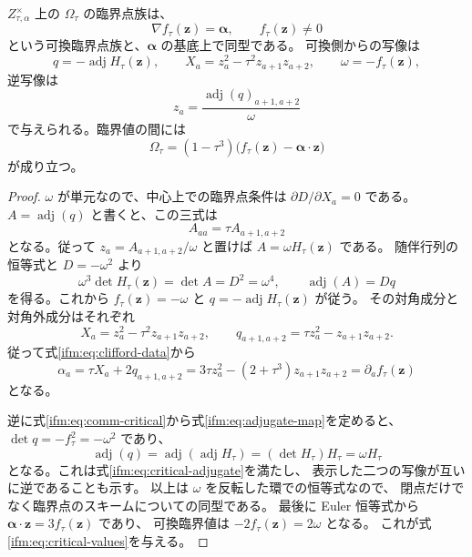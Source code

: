 \begin{lemma}[非零中心値における臨界点の明示同型]
\label{ifm:lem:adjugate-critical}
$Z_{\tau,\alpha}^{\times}$ 上の $\Omega_\tau$ の臨界点族は、
\begin{equation}\label{ifm:eq:comm-critical}
        \nabla f_\tau(\mathbf z)=\boldsymbol\alpha,
                    \qquad f_\tau(\mathbf z)\ne0
\end{equation}
という可換臨界点族と、$\boldsymbol\alpha$ の基底上で同型である。
可換側からの写像は
\begin{equation}\label{ifm:eq:adjugate-map}
 q=-\operatorname{adj}H_\tau(\mathbf z),\qquad
 X_a=z_a^2-\tau^2z_{a+1}z_{a+2},\qquad
 \omega=-f_\tau(\mathbf z),
\end{equation}
逆写像は
\begin{equation}\label{ifm:eq:adjugate-inverse}
              z_a=\frac{\operatorname{adj}(q)_{a+1,a+2}}{\omega}
\end{equation}
で与えられる。臨界値の間には
\begin{equation}\label{ifm:eq:critical-values}
   \Omega_\tau=(1-\tau^3)
           \bigl(f_\tau(\mathbf z)-\boldsymbol\alpha\cdot\mathbf z\bigr)
\end{equation}
が成り立つ。
\end{lemma}

\begin{proof}
$\omega$ が単元なので、中心上での臨界点条件は
$\partial D/\partial X_a=0$ である。
$A=\operatorname{adj}(q)$ と書くと、この三式は
\begin{equation}\label{ifm:eq:critical-adjugate}
                         A_{aa}=\tau A_{a+1,a+2}
\end{equation}
となる。従って $z_a=A_{a+1,a+2}/\omega$ と置けば
$A=\omega H_\tau(\mathbf z)$ である。
随伴行列の恒等式と $D=-\omega^2$ より
\[
 \omega^3\det H_\tau(\mathbf z)=\det A=D^2=\omega^4,
 \qquad
 \operatorname{adj}(A)=Dq
\]
を得る。これから $f_\tau(\mathbf z)=-\omega$ と
$q=-\operatorname{adj}H_\tau(\mathbf z)$ が従う。
その対角成分と対角外成分はそれぞれ
\[
 X_a=z_a^2-\tau^2z_{a+1}z_{a+2},\qquad
 q_{a+1,a+2}=\tau z_a^2-z_{a+1}z_{a+2}.
\]
従って式\eqref{ifm:eq:clifford-data}から
\[
 \alpha_a=\tau X_a+2q_{a+1,a+2}
           =3\tau z_a^2-(2+\tau^3)z_{a+1}z_{a+2}
           =\partial_a f_\tau(\mathbf z)
\]
となる。

逆に式\eqref{ifm:eq:comm-critical}から式\eqref{ifm:eq:adjugate-map}を定めると、
$\det q=-f_\tau^2=-\omega^2$ であり、
\[
 \operatorname{adj}(q)
   =\operatorname{adj}(\operatorname{adj}H_\tau)
   =(\det H_\tau)H_\tau=\omega H_\tau
\]
となる。これは式\eqref{ifm:eq:critical-adjugate}を満たし、
表示した二つの写像が互いに逆であることも示す。
以上は $\omega$ を反転した環での恒等式なので、
閉点だけでなく臨界点のスキームについての同型である。
最後に Euler 恒等式から
$\boldsymbol\alpha\cdot\mathbf z=3f_\tau(\mathbf z)$ であり、
可換臨界値は $-2f_\tau(\mathbf z)=2\omega$ となる。
これが式\eqref{ifm:eq:critical-values}を与える。
\end{proof}

